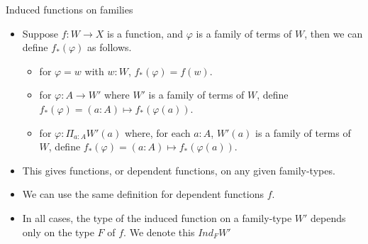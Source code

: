 \documentclass[10 pt., handout]{beamer}
\theoremstyle{plain}
\theoremstyle{remark}
\begin{document}
\begin{frame}{Induced functions on families}

\begin{itemize}

\item Suppose $f: W \to X$ is a function, and $\varphi$ is a family of terms of $W$, then we can define $f_*(\varphi)$ as follows.
\begin{itemize}
\item for $\varphi = w$ with $w : W$, $f_*(\varphi) = f(w)$.
\item for $\varphi : A \to W'$ where $W'$ is a family of terms of $W$, define $f_*(\varphi) = (a : A) \mapsto f_*(\varphi(a))$.
\item for $\varphi : \Pi_{a : A} W'(a)$ where, for each $a : A$, $W'(a)$ is a family of terms of $W$, define $f_*(\varphi) = (a : A) \mapsto f_*(\varphi(a))$.
\end{itemize}

\item This gives functions, or dependent functions, on any given family-types.

\item We can use the same definition for dependent functions $f$. 

\item In all cases, the type of the induced function on a family-type $W'$ depends only on the type $F$ of $f$. We denote this $Ind_F W'$

\end{itemize}

\end{frame}
\end{document}
